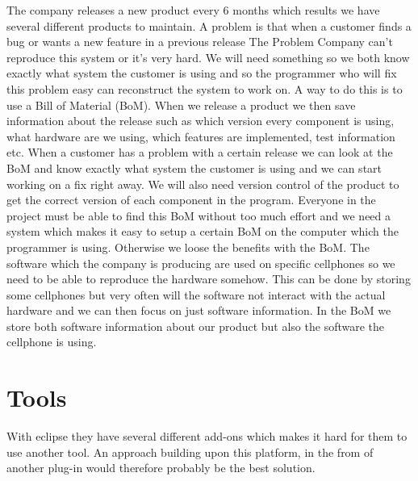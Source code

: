\documentclass[a4paper,11pt]{article}
\begin{document}
The company releases a new product every 6 months which results we have several different products to maintain. A problem is that when a customer finds a bug or wants a new feature in a previous release The Problem Company can't reproduce this system or it's very hard. We will need something so we both know exactly what system the customer is using and so the programmer who will fix this problem easy can reconstruct the system to work on. A way to do this is to use a Bill of Material (BoM). When we release a product we then save information about the release such as which version every component is using, what hardware are we using, which features are implemented, test information etc.
When a customer has a problem with a certain release we can look at the BoM and know exactly what system the customer is using and we can start working on a fix right away.
We will also need version control of the product to get the correct version of each component in the program.
Everyone in the project must be able to find this BoM without too much effort and we need a system which makes it easy to setup a certain BoM on the computer which the programmer is using. Otherwise we loose the benefits with the BoM. The software which the company is producing are used on specific cellphones so we need to be able to reproduce the hardware somehow. This can be done by storing some cellphones but very often will the software not interact with the actual hardware and we can then focus on just software information. In the BoM we store both software information about our product but also the software the cellphone is using.


\section{Tools}
With eclipse they have several different add-ons which makes it hard for them to use another tool. An approach building upon this platform, in the from of another plug-in would therefore probably be the best solution.



\end{document}
